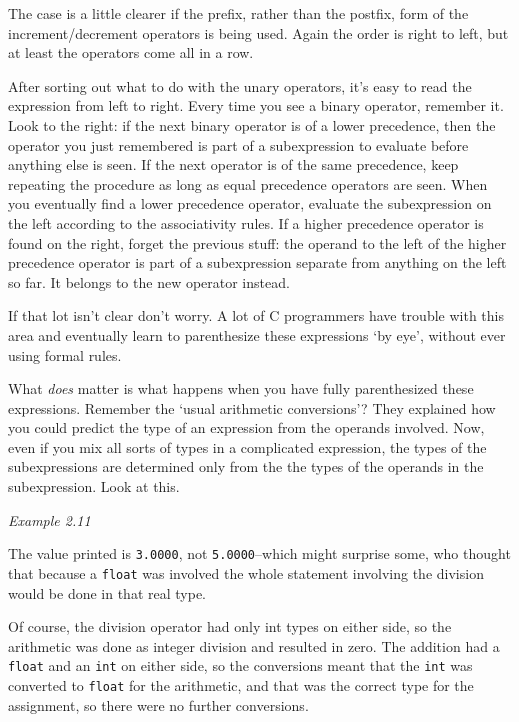    The case is a little clearer if the prefix, rather than the postfix,
    form of the increment/decrement operators is being used. Again the order
    is right to left, but at least the operators come all in a row.


   After sorting out what to do with the unary operators, it's easy to read
    the expression from left to right. Every time you see a binary operator,
    remember it. Look to the right: if the next binary operator is of a lower
    precedence, then the operator you just remembered is part of a
    subexpression to evaluate before anything else is seen. If the next
    operator is of the same precedence, keep repeating the procedure as long
    as equal precedence operators are seen. When you eventually find a lower
    precedence operator, evaluate the subexpression on the left according to
    the associativity rules. If a higher precedence operator is found on the
    right, forget the previous stuff: the operand to the left of the higher
    precedence operator is part of a subexpression separate from anything on
    the left so far. It belongs to the new operator instead.


   If that lot isn't clear don't worry. A lot of C programmers have
    trouble with this area and eventually learn to parenthesize these
    expressions `by eye', without ever using formal rules.


   What \textit{does} matter is what happens when you have fully
    parenthesized these expressions. Remember the `usual arithmetic
    conversions'? They explained how you could predict the type of an
    expression from the operands involved. Now, even if you mix all sorts of
    types in a complicated expression, the types of the subexpressions are
    determined only from the the types of the operands in the subexpression.
    Look at this.


   \begin{center}\textit{Example 2.11}\end{center}


   The value printed is \texttt{3.0000},
    not \texttt{5.0000}--which might surprise some, who thought
    that because a \texttt{float} was involved the whole statement
    involving the division would be done in that real type.


   Of course, the division operator had only int types on either side, so
    the arithmetic was done as integer division and resulted in zero. The
    addition had a \texttt{float} and an \texttt{int} on either side,
    so the conversions meant that the \texttt{int} was converted to
    \texttt{float} for the arithmetic, and that was the correct type for
    the assignment, so there were no further conversions.


